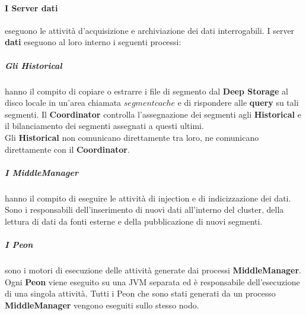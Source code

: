 \paragraph{I Server dati} eseguono le attività d'acquisizione e archiviazione dei dati interrogabili.
I server \textbf{dati} eseguono al loro interno i seguenti processi:
\subparagraph{Gli Historical} hanno il compito di copiare o estrarre i file di segmento dal \textbf{Deep Storage} al disco locale in un’area
chiamata $segment cache$ e di rispondere alle \textbf{query} su tali segmenti.
Il \textbf{Coordinator} controlla l’assegnazione dei segmenti agli \textbf{Historical} e il bilanciamento dei segmenti assegnati
a questi ultimi.\\ 
Gli \textbf{Historical} non comunicano direttamente tra loro, ne comunicano direttamente con il \textbf{Coordinator}. 
\subparagraph{I MiddleManager} 
hanno il compito di eseguire le attività di \gls{injection}{} e di indicizzazione dei dati.\\
Sono i responsabili dell'inserimento di nuovi dati all'interno del \gls{cluster}{}, della lettura di dati da fonti esterne e della pubblicazione di 
nuovi segmenti.\\
\subparagraph{I  Peon} sono i motori di esecuzione delle attività generate dai processi \textbf{MiddleManager}. \\
Ogni \textbf{Peon} viene eseguito su una JVM separata ed è responsabile dell’esecuzione di una singola attività. 
Tutti i Peon che sono stati generati da un processo \textbf{MiddleManager} vengono eseguiti sullo stesso nodo.

